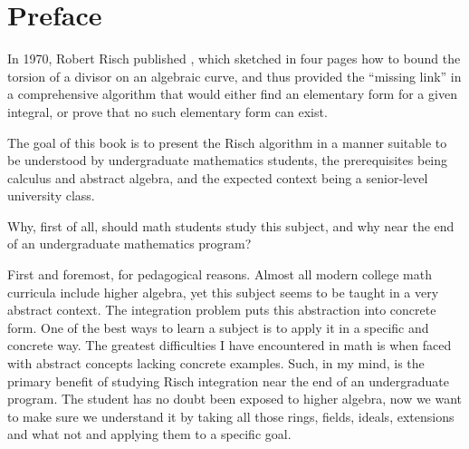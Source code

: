 
\chapter*{Preface}

\begin{comment}
This book grew out of an abortive class in Risch Integration that I
taught at University of Maryland at College Park in the spring of
2006,\footnote{I am not a professor at UMCP, and am not affiliated
with the University of Maryland in any way other than having studied
physics there as an undergraduate and being a member of the University
Alumni Association.}  which I canceled after three weeks when I
had no students left.  Aside from the lack of student interest (it was
a non-credit class), another deficiency in the class became apparent
to me --- the lack of a good textbook.  So I am writing this book to
fill this perceived gap, the need for a senior level undergraduate
text on differential algebra, developing the subject so far as the
solution of the problem of integration in finite terms (the
integration problem), the theory's most famous application to date.
\end{comment}

In 1970, Robert Risch published \cite{risch}, which sketched in four
pages how to bound the torsion of a divisor on an algebraic curve, and
thus provided the ``missing link'' in a comprehensive algorithm that
would either find an elementary form for a given integral, or prove
that no such elementary form can exist.

The goal of this book is to present the Risch algorithm in a manner
suitable to be understood by undergraduate mathematics students, the
prerequisites being calculus and abstract algebra, and the expected
context being a senior-level university class.

Why, first of all, should math students study this subject, and why
near the end of an undergraduate mathematics program?

First and foremost, for pedagogical reasons.  Almost all modern
college math curricula include higher algebra, yet this subject seems
to be taught in a very abstract context.  The integration problem puts
this abstraction into concrete form.
One of the best ways to learn a subject
is to apply it in a specific and concrete way.  The greatest
difficulties I have encountered in math is when faced with abstract
concepts lacking concrete examples.  Such, in my mind, is the primary
benefit of studying Risch integration near the end of an undergraduate
program.  The student has no doubt been exposed to higher algebra, now
we want to make sure we understand it by taking all those rings,
fields, ideals, extensions and what not and applying them to a
specific goal.

